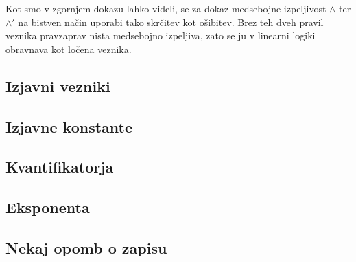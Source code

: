 Kot smo v zgornjem dokazu lahko videli, se za dokaz medsebojne izpeljivost $\land$ ter $\land'$ na bistven način uporabi tako skrčitev kot ošibitev. Brez teh dveh pravil veznika pravzaprav nista medsebojno izpeljiva, zato se ju v linearni logiki obravnava kot ločena veznika.

\subsection{Izjavni vezniki}


\subsection{Izjavne konstante}


\subsection{Kvantifikatorja}


\subsection{Eksponenta}


\subsection{Nekaj opomb o zapisu}

